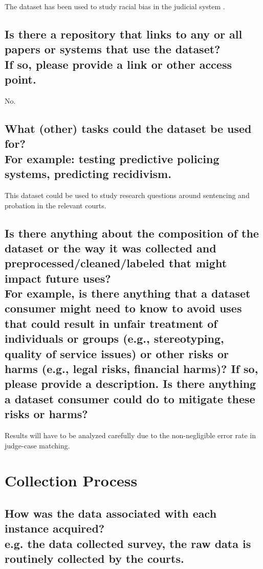 \documentclass[letterpaper, 10 pt, conference]{ieeeconf}  %
\newcommand{\subtitle}[1]{{\\ \small \normalfont \color{purple} #1}}
\begin{document}
The dataset has been used to study racial bias in the judicial system \cite{ciocanel2020justfair, smith2021most, sargent2021identifying, meyer2022flipping}.

\subsection{Is there a repository that links to any or all papers or systems that use the dataset? \subtitle{If so, please provide a link or other access point. }}

No.

\subsection{What (other) tasks could the dataset be used for? \subtitle{For example: testing predictive policing systems, predicting recidivism.}}

This dataset could be used to study research questions around sentencing and probation in the relevant courts. 


\subsection{Is there anything about the composition of the dataset or the way it was collected and preprocessed/cleaned/labeled that might impact future uses? \subtitle{For example, is there anything that a dataset consumer might need to know to avoid uses that could result in unfair treatment of individuals or groups (e.g., stereotyping, quality of service issues) or other risks or harms (e.g., legal risks, financial harms)? If so, please provide a description. Is there anything a dataset consumer could do to mitigate these risks or harms?}}

Results will have to be analyzed carefully due to the non-negligible error rate in judge-case matching. 

\section{Collection Process}

\subsection{How was the data associated with each instance acquired? \subtitle {e.g. the data collected survey, the raw data is routinely collected by the courts.}}
\end{document}
